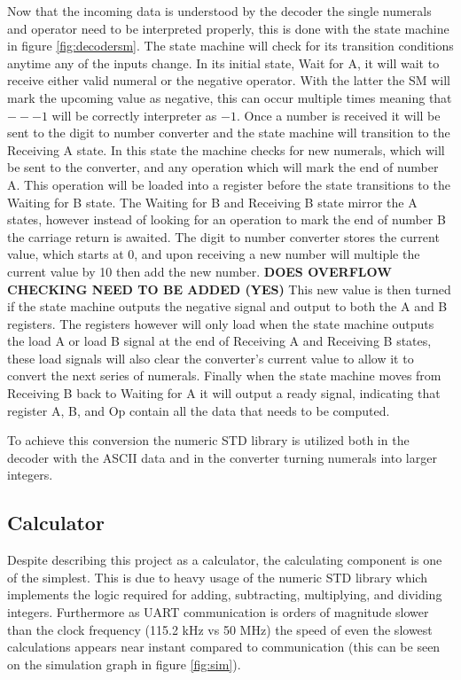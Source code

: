 \documentclass[11pt]{article}
\begin{document}
Now that the incoming data is understood by the decoder the single numerals and operator need to be interpreted properly, this is done with the state machine in figure \ref{fig:decodersm}.
The state machine will check for its transition conditions anytime any of the inputs change. 
In its initial state, Wait for A, it will wait to receive either valid numeral or the negative operator. 
With the latter the SM will mark the upcoming value as negative, this can occur multiple times meaning that $---1$ will be correctly interpreter as $-1$.
Once a number is received it will be sent to the digit to number converter and the state machine will transition to the Receiving A state. 
In this state the machine checks for new numerals, which will be sent to the converter, and any operation which will mark the end of number A.
This operation will be loaded into a register before the state transitions to the Waiting for B state.
The Waiting for B and Receiving B state mirror the A states, however instead of looking for an operation to mark the end of number B the carriage return is awaited.
The digit to number converter stores the current value, which starts at 0, and upon receiving a new number will multiple the current value by 10 then add the new number. 
\textbf{DOES OVERFLOW CHECKING NEED TO BE ADDED (YES)} 
This new value is then turned if the state machine outputs the negative signal and output to both the A and B registers.
The registers however will only load when the state machine outputs the load A or load B signal at the end of Receiving A and Receiving B states,
these load signals will also clear the converter's current value to allow it to convert the next series of numerals.
Finally when the state machine moves from Receiving B back to Waiting for A it will output a ready signal, indicating that register A, B, and Op contain all the data that needs to be computed.

To achieve this conversion the numeric STD library is utilized both in the decoder with the ASCII data and in the converter turning numerals into larger integers.
\subsection{Calculator}

Despite describing this project as a calculator, the calculating component is one of the simplest.
This is due to heavy usage of the numeric STD library which implements the logic required for adding, subtracting, multiplying, and dividing integers.
Furthermore as UART communication is orders of magnitude slower than the clock frequency (115.2 kHz vs 50 MHz)
the speed of even the slowest calculations appears near instant compared to communication (this can be seen on the simulation graph in figure \ref{fig:sim}).
\end{document}
